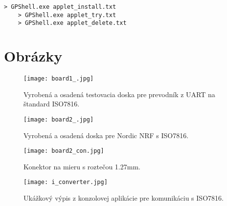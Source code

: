 \documentclass[12pt,a4wide,oneside,openright]{report}
\renewcommand\lstlistingname{Ukážka kódu}
\begin{document}
\renewcommand\lstlistingname{}
	\begin{lstlisting}[caption={Nainštalovanie appletu cez nástroj GPShell.}, label={lst:gpshell}] 
	> GPShell.exe applet_install.txt
	> GPShell.exe applet_try.txt
	> GPShell.exe applet_delete.txt
	\end{lstlisting}


\chapter{Obrázky} \label{s_pictures}
\begin{figure*}[h]
	\centering
	\texttt{[image: board1\_.jpg]}
	\caption{Vyrobená a osadená testovacia doska pre prevodník z UART na štandard ISO7816.}
	\label{f:i_board_iso}
\end{figure*}

\begin{figure*}[h]
	\centering
	\texttt{[image: board2\_.jpg]}
	\caption{Vyrobená a osadená doska pre Nordic NRF s ISO7816.}
	\label{f:i_board_nrf}
\end{figure*}

\begin{figure*}[h]
	\centering
	\texttt{[image: board2\_con.jpg]}
	\caption{Konektor na mieru s roztečou 1.27mm.}
	\label{f:i_board2}
\end{figure*}


\begin{figure*}[h]
	\centering
	\texttt{[image: i\_converter.jpg]}
	\caption{Ukážkový výpis z konzolovej aplikácie pre komunikáciu s ISO7816.}
	\label{f:i_iso_dekoder}
\end{figure*}
\end{document}
